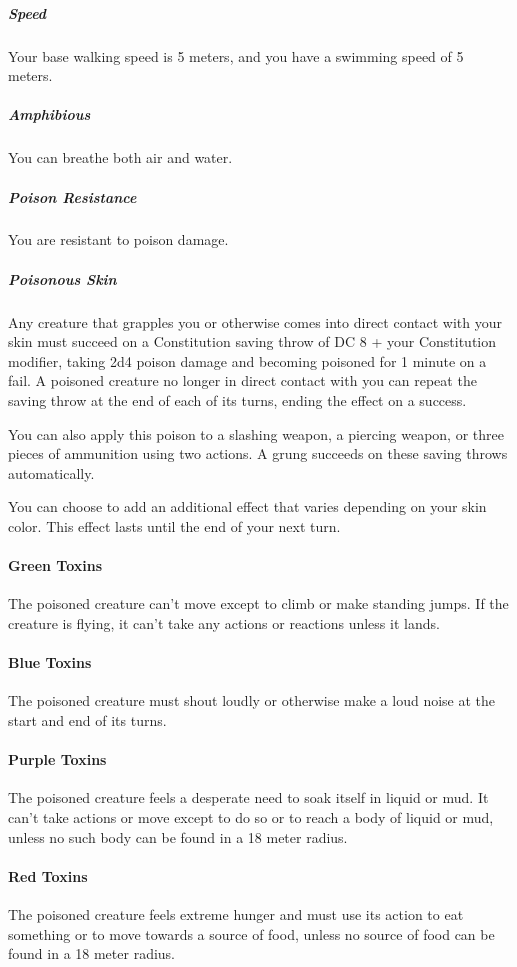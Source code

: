    \subparagraph{Speed} Your base walking speed is 5 meters, and you have a swimming speed of 5 meters.

    \subparagraph{Amphibious} You can breathe both air and water.

    \subparagraph{Poison Resistance} You are resistant to poison damage.

    \subparagraph{Poisonous Skin} Any creature that grapples you or otherwise comes into direct contact with your skin must succeed on a Constitution saving throw of DC 8 + your Constitution modifier, taking 2d4 poison damage and becoming poisoned for 1 minute on a fail.
    A poisoned creature no longer in direct contact with you can repeat the saving throw at the end of each of its turns, ending the effect on a success.

    You can also apply this poison to a slashing weapon, a piercing weapon, or three pieces of ammunition using two actions.
    A grung succeeds on these saving throws automatically.

    You can choose to add an additional effect that varies depending on your skin color.
    This effect lasts until the end of your next turn.

        \paragraph{Green Toxins} The poisoned creature can't move except to climb or make standing jumps.
        If the creature is flying, it can't take any actions or reactions unless it lands.

        \paragraph{Blue Toxins} The poisoned creature must shout loudly or otherwise make a loud noise at the start and end of its turns.

        \paragraph{Purple Toxins} The poisoned creature feels a desperate need to soak itself in liquid or mud.
        It can't take actions or move except to do so or to reach a body of liquid or mud, unless no such body can be found in a 18 meter radius.

        \paragraph{Red Toxins} The poisoned creature feels extreme hunger and must use its action to eat something or to move towards a source of food, unless no source of food can be found in a 18 meter radius.

